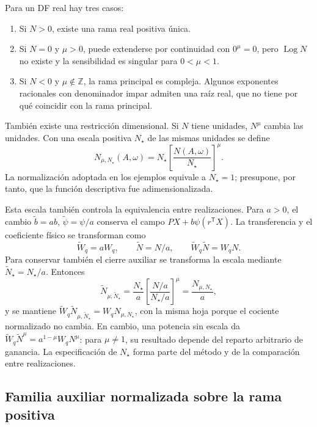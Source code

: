 Para un DF real hay tres casos:
\begin{enumerate}
 \item Si \(N>0\), existe una rama real positiva única.
 \item Si \(N=0\) y \(\mu>0\), puede extenderse por continuidad con
       \(0^\mu=0\), pero \(\operatorname{Log}N\) no existe y la sensibilidad
       es singular para \(0<\mu<1\).
 \item Si \(N<0\) y \(\mu\notin\mathbb Z\), la rama principal es compleja.
       Algunos exponentes racionales con denominador impar admiten una raíz
       real, que no tiene por qué coincidir con la rama principal.
\end{enumerate}

También existe una restricción dimensional. Si \(N\) tiene unidades,
\(N^\mu\) cambia las unidades. Con una escala positiva \(N_\star\) de las mismas
unidades se define
\begin{equation}
 N_{\mu,N_\star}(A,\omega)
 =N_\star\left[\frac{N(A,\omega)}{N_\star}\right]^\mu.
 \label{eq:machado-normalized}
\end{equation}
La normalización adoptada en los ejemplos equivale a \(N_\star=1\); presupone,
por tanto, que la función descriptiva fue adimensionalizada.

Esta escala también controla la equivalencia entre realizaciones. Para
\(a>0\), el cambio
\(\widetilde b=ab\), \(\widetilde\psi=\psi/a\) conserva el campo
\(PX+b\psi(r^{\mathsf T}X)\). La transferencia y el coeficiente físico
se transforman como
\[
 \widetilde W_q=aW_q,\qquad \widetilde N=N/a,
 \qquad \widetilde W_q\widetilde N=W_qN.
\]
Para conservar también el cierre auxiliar se transforma la escala mediante
\(\widetilde N_\star=N_\star/a\). Entonces
\begin{equation}
 \widetilde N_{\mu,\widetilde N_\star}
 =\frac{N_\star}{a}
 \left[\frac{N/a}{N_\star/a}\right]^\mu
 =\frac{N_{\mu,N_\star}}{a},
 \label{eq:machado-scale-covariance}
\end{equation}
y se mantiene
\(\widetilde W_q\widetilde N_{\mu,\widetilde N_\star}
=W_qN_{\mu,N_\star}\), con la misma hoja porque el cociente
normalizado no cambia. En cambio, una potencia sin escala da
\(\widetilde W_q\widetilde N^\mu=a^{1-\mu}W_qN^\mu\): para
\(\mu\ne1\), su resultado depende del reparto arbitrario de ganancia.
La especificación de \(N_\star\) forma parte del método y de la
comparación entre realizaciones.

\subsection{Familia auxiliar normalizada sobre la rama positiva}

